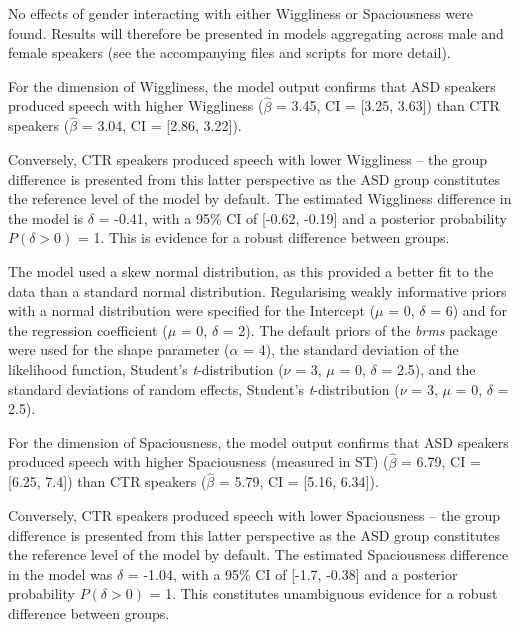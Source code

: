 No effects of gender interacting with either Wiggliness or Spaciousness were found. Results will therefore be presented in models aggregating across male and female speakers (see the accompanying  files and scripts for more detail).

	\label{int_results_overall_group_bayesian_wiggliness}

For the dimension of Wiggliness, the model output confirms that ASD speakers produced speech with higher Wiggliness (\(\hat{\beta}\) = 3.45, CI = {[}3.25, 3.63{]}) than CTR speakers (\(\hat{\beta}\) = 3.04, CI = {[}2.86, 3.22{]}).

Conversely, CTR speakers produced speech with lower Wiggliness -- the group difference is presented from this latter perspective as the ASD group constitutes the reference level of the model by default. The estimated Wiggliness difference in the model is \(\delta\) = -0.41, with a 95\% CI of {[}-0.62, -0.19{]} and a posterior probability \(P(\delta > 0)\) = 1. This is evidence for a robust difference between groups.

The model used a skew normal distribution, as this provided a better fit to the data than a standard normal distribution. Regularising weakly informative priors with a normal distribution were specified for the Intercept (\(\mu\) = 0, \(\delta\) = 6) and for the regression coefficient (\(\mu\) = 0, \(\delta\) = 2). The default priors of the \emph{brms} package were used for the shape parameter (\(\alpha\) = 4), the standard deviation of the likelihood function, Student's \emph{t}-distribution (\(\nu\) = 3, \(\mu\) = 0, \(\delta\) = 2.5), and the standard deviations of random effects, Student's \emph{t}-distribution (\(\nu\) = 3, \(\mu\) = 0, \(\delta\) = 2.5).


	\label{sec:int_results_overall_group_bayesian_spaciousness}

For the dimension of Spaciousness, the model output confirms that ASD speakers produced speech with higher Spaciousness (measured in ST) (\(\hat{\beta}\) = 6.79, CI = {[}6.25, 7.4{]}) than CTR speakers (\(\hat{\beta}\) = 5.79, CI = {[}5.16, 6.34{]}).

Conversely, CTR speakers produced speech with lower Spaciousness -- the group difference is presented from this latter perspective as the ASD group constitutes the reference level of the model by default. The estimated Spaciousness difference in the model was \(\delta\) = -1.04, with a 95\% CI of {[}-1.7, -0.38{]} and a posterior probability \(P(\delta > 0)\) = 1. This constitutes unambiguous evidence for a robust difference between groups.

